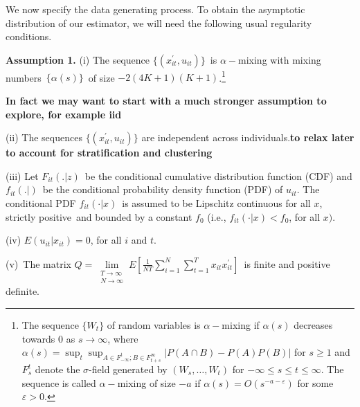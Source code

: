 \documentclass[a4paper,notitlepage,thmsb,11pt]{article}
\begin{document}
We now specify the data generating process. To obtain the asymptotic
distribution of our estimator, we will need the following usual regularity
conditions.

\vskip0.5cm%

\noindent%
\textbf{Assumption 1.} (i) The sequence $\{(x_{it}^{\prime },u_{it})\}$\ is $%
\alpha -$mixing with mixing numbers\ $\{\alpha (s)\}$\ of size $-2\left(
4K+1\right) \left( K+1\right) $.\footnote{%
The sequence $\{W_{t}\}$ of random variables is $\alpha -$mixing if $\alpha
(s)$ decreases towards $0$ as $s\rightarrow \infty $, where $\alpha
(s)=\sup_{t}\sup_{A\in F_{-\infty }^{t};B\in F_{t+s}^{\infty }}|P(A\cap
B)-P(A)P(B)|$ for $s\geq 1$ and $F_{s}^{t}$ denote the $\sigma $-field
generated by $(W_{s},\ldots ,W_{t})$ for $-\infty \leq s\leq t\leq \infty $.
The sequence is called $\alpha -$mixing of size $-a$ if $\alpha
(s)=O(s^{-a-\varepsilon })$ for some $\varepsilon >0$.}

\textbf{In fact we may want to start with a much stronger assumption to
explore, for example iid}

\noindent%
(ii) The sequences $\{(x_{it}^{\prime },u_{it})\}$ are independent across
individuals.\textbf{to relax later to account for stratification and
clustering}

\noindent%
(iii) Let $F_{it}(.|z)$\ be the conditional cumulative distribution function
(CDF) and $f_{it}(.|)$\ be the conditional probability density function
(PDF) of $u_{it}$. The conditional PDF $f_{it}(\cdot |x)$\ is assumed to be
Lipschitz continuous for all $x$, strictly positive\ and bounded by a
constant $f_{0}$ (i.e., $f_{it}(\cdot |x)<f_{0}$, for all $x)$.

\noindent%
(iv) $E(u_{it}|x_{it})=0$, for all $i$ and $t$.

\noindent%
(v)\ The matrix $Q=\lim\limits_{\substack{ T\rightarrow \infty  \\ %
N\rightarrow \infty }}E\left[ \frac{1}{NT}\sum\limits_{i=1}^{N}\sum%
\limits_{t=1}^{T}x_{it}x_{it}^{\prime }\right] $\ is finite and positive
definite.
\end{document}
